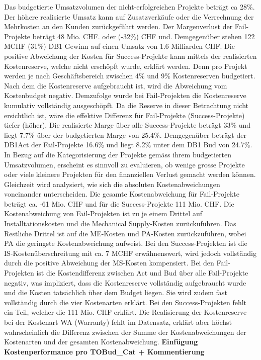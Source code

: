 \newline Das budgetierte Umsatzvolumen der nicht-erfolgreichen Projekte beträgt ca 28\%. Der höhere realisierte Umsatz kann auf Zusatzverkäufe oder die Verrechnung der Mehrkosten an den Kunden zurückgeführt werden. Der Margenverlust der Fail-Projekte beträgt 48 Mio. CHF. oder (-32\%) CHF und. Demgegenüber stehen 122 MCHF (31\%) DB1-Gewinn auf einen Umsatz von 1.6 Milliarden CHF. Die positive Abweichung der Kosten für Success-Projekte kann mittels der realisierten Kostenreserve, welche nicht erschöpft wurde, erklärt werden. Denn pro Projekt werden je nach Geschäftsbereich zwischen 4\% und 9\% Kostenreserven budgetiert. Nach dem die Kostenreserve aufgebraucht ist, wird die Abweichung vom Kostenbudget negativ. Demzufolge wurde bei Fail-Projekten die Kostenreserve kumulativ vollständig ausgeschöpft. Da die Reserve in dieser Betrachtung nicht ersichtlich ist, wäre die effektive Differenz für Fail-Projekte (Success-Projekte) tiefer (höher). Die realisierte Marge über alle Success-Projekte beträgt 33\% und liegt 7.7\% über der budgetierten Marge von 25.4\%. Demgegenüber beträgt der DB1Act der Fail-Projekte 16.6\% und liegt 8.2\% unter dem DB1 Bud von 24.7\%.
\newpage
In Bezug auf die Kategorisierung der Projekte gemäss ihrem budgetierten Umsatzvolumen, erscheint es sinnvoll zu evaluieren, ob wenige grosse Projekte oder viele kleinere Projekten für den finanziellen Verlust gemacht werden können. Gleichzeit wird analysiert, wie sich die absoluten Kostenabweichungen voneinander unterscheiden. \newline
Die gesamte Kostenabweichung für Fail-Projekte beträgt ca. -61 Mio. CHF und für die Success-Projekte 111 Mio. CHF. Die Kostenabweichung von Fail-Projekten ist zu je einem Drittel auf Installtationskosten und die Mechanical Supply-Kosten zurückuführen. Das Restliche Drittel ist auf die ME-Kosten und PA-Kosten zurückzuführen, wobei PA die geringste Kostenabweichung aufweist. Bei den Success-Projekten ist die IS-Kostenüberschreitung mit ca. 7 MCHF erwähnenswert, wird jedoch vollständig durch die positive Abweichung der MS-Kosten kompensiert. Bei den Fail-Projekten ist die Kostendifferenz zwischen Act und Bud über alle Fail-Projekte negativ, was impliziert, dass die Kostenreserve vollständig aufgebraucht wurde und die Kosten tatsächlich über dem Budget liegen. Sie wird zudem fast vollständig durch die vier Kostenarten erklärt. Bei den Success-Projekten fehlt ein Teil, welcher die 111 Mio. CHF erklärt. Die Realisierung der Kostenreserve bei der Kostenart WA (Warranty) fehlt im Datensatz, erklärt aber höchst wahrscheinlich die Differenz zwischen der Summe der Kostenabweichungen der Kostenarten und der gesamten Kostenabweichung.
\newline\textbf{Einfügung Kostenperformance pro TOBud\_Cat + Kommentierung}
